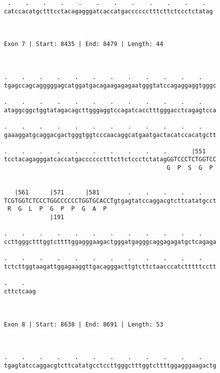 \documentclass{article}
\begin{document}
\begin{Verbatim}
 .    .    .    .    .    .    .    .    .    .    .    .  
catccacatgctttcctacagagggatcaccatgacccccctttcttctccctctatag
                                                           
                                                           
 
Exon 7 | Start: 8435 | End: 8479 | Length: 44



.    .    .    .    .    .    .    .    .    .    .    .    
tgagccagcagggggagcatggatgacagaagagagaatgggtatccagaggaggtgggc
                                                            
.    .    .    .    .    .    .    .    .    .    .    .    
ataggcggctggtatagacagcttgggaggtccagatcacctttgggacctcagagtcca
                                                            
.    .    .    .    .    .    .    .    .    .    .    .    
gaaaggatgcaggacgactgggtggtcccaacaggcatgaatgactacatccacatgctt
                                                            
.    .    .    .    .    .    .    .    .    .       |551   
tcctacagagggatcaccatgacccccctttcttctccctctatagGGTCCCTCTGGTCC
                                              G  P  S  G  P 
                                                            
  
   |561      |571      |581        .    .    .    .    .    
TCGTGGTCTCCCTGGCCCCCCTGGTGCACCTgtgagtatccaggacgtcttcatatgcct
 R  G  L  P  G  P  P  G  A  P                               
             |191                                           
  
.    .    .    .    .    .    .    .    .    .    .    .    
ccttgggctttggtcttttggagggaagactgggatgagggcaggagagatgctcagaga
                                                            
.    .    .    .    .    .    .    .    .    .    .    .    
tctcttggtaagattggagaaggttgacagggacttgtcttctaacccatctttttcctt
                                                            
.    .   
cttctcaag
         
         
 
Exon 8 | Start: 8638 | End: 8691 | Length: 53



.    .    .    .    .    .    .    .    .    .    .    .    
tgagtatccaggacgtcttcatatgcctccttgggctttggtcttttggagggaagactg
                                                            

\end{Verbatim}
\end{document}
